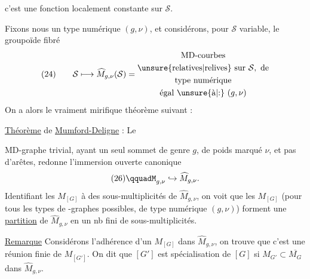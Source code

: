 
c'est une fonction localement constante sur $\mathcal S$.

Fixons nous un type numérique $(g,\nu)$, et considérons, pour $\mathcal S$ variable, le groupoïde fibré
\[
(24)\qquad\mathcal S\longmapsto\widehat{M}_{g,\nu}(\mathcal S)=\begin{gathered}\text{MD-courbes}\\\text{\unsure{relatives|relives} sur }\mathcal S,\text{ de}\\\text{type numérique}\\\text{égal \unsure{à|:} }(g,\nu)\end{gathered}
\]
On a alors le vraiment mirifique théorème suivant :

\uline{Théorème} de \uline{Mumford-Deligne} : Le


MD-graphe trivial, ayant un seul sommet de genre $g$, de poids marqué $\nu$, et pas d'arêtes, redonne l'immersion ouverte canonique
\[
(26)\qquadM_{g,\nu}\hookrightarrow\widehat{M}_{g,\nu}.
\]
Identifiant les $M_{[G]}$ à des sous-multiplicités de $\widehat{M}_{g,\nu}$, on voit que les $M_{[G]}$ (pour tous les types de -graphes possibles, de type numérique $(g,\nu)$) forment une \uline{partition} de $\widehat{M}_{g,\nu}$ en un nb fini de sous-multiplicités.

\uline{Remarque} Considérons l'adhérence d'un $M_{[G]}$ dans $\widehat{M}_{g,\nu}$, on trouve que c'est une réunion finie de $M_{[G']}$. On dit que $[G']$ est spécialisation de $[G]$ si $M_{G'}\subset\overline{M_G}$ dans $\widehat{M}_{g,\nu}$.

